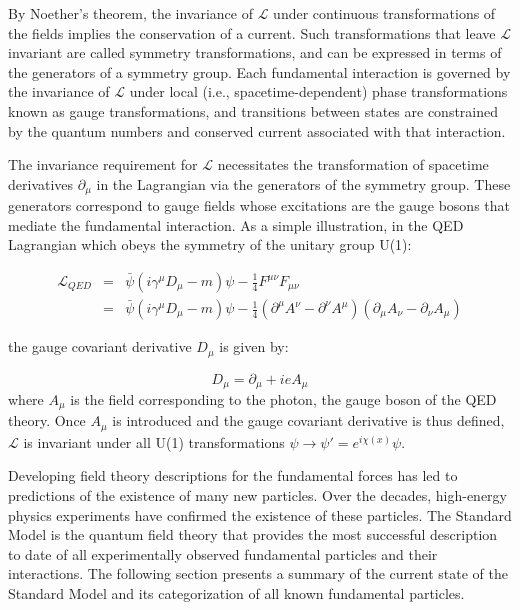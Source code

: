 By Noether's theorem, the invariance of $\mathcal{L}$ under continuous transformations of the fields implies the conservation of a current. Such transformations that leave $\mathcal{L}$ invariant are called symmetry transformations, and can be expressed in terms of the generators of a symmetry group. Each fundamental interaction is governed by the invariance of $\mathcal{L}$ under local (i.e., spacetime-dependent) phase transformations known as gauge transformations, and transitions between states are constrained by the quantum numbers and conserved current associated with that interaction.

The invariance requirement for $\mathcal{L}$ necessitates the transformation of spacetime derivatives $\partial_{\mu}$ in the Lagrangian via the generators of the symmetry group. These generators correspond to gauge fields whose excitations are the gauge bosons that mediate the fundamental interaction. As a simple illustration, in the QED Lagrangian which obeys the symmetry of the unitary group U(1):

\begin{eqnarray}
\mathcal{L}_{QED} &=& \bar{\psi}(i\gamma^{\mu}D_{\mu} - m)\psi -\frac{1}{4}F^{\mu\nu}F_{\mu\nu} \nonumber \\
    &=& \bar{\psi}(i\gamma^{\mu}D_{\mu} - m)\psi -\frac{1}{4}(\partial^{\mu}A^{\nu} - \partial^{\nu}A^{\mu})(\partial_{\mu}A_{\nu} - \partial_{\nu}A_{\mu})
\label{eq:QEDLagrangian}
\end{eqnarray}

the gauge covariant derivative $D_{\mu}$ is given by:

\begin{equation}
D_{\mu} = \partial_{\mu} + ieA_{\mu}
\label{eq:covariant-derivative}
\end{equation}
where $A_{\mu}$ is the field corresponding to the photon, the gauge boson of the QED theory. Once $A_{\mu}$ is introduced and the gauge covariant derivative is thus defined, $\mathcal{L}$ is invariant under all U(1) transformations $\psi \rightarrow \psi' = e^{i\chi(x)}\psi$.

Developing field theory descriptions for the fundamental forces has led to predictions of the existence of many new particles. Over the decades, high-energy physics experiments have confirmed the existence of these particles. The Standard Model is the quantum field theory that provides the most successful description to date of all experimentally observed fundamental particles and their interactions. The following section presents a summary of the current state of the Standard Model and its categorization of all known fundamental particles.


